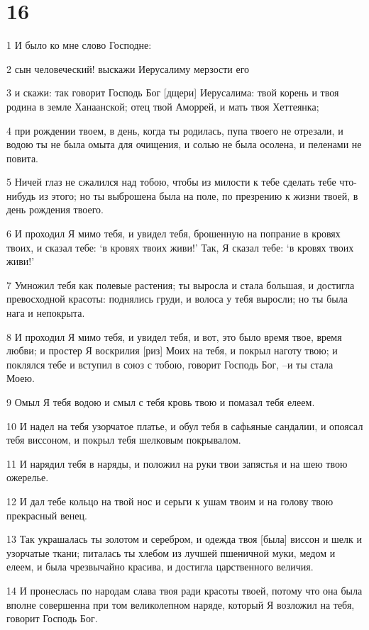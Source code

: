 \chapter{16}

\par 1 И было ко мне слово Господне:
\par 2 сын человеческий! выскажи Иерусалиму мерзости его
\par 3 и скажи: так говорит Господь Бог [дщери] Иерусалима: твой корень и твоя родина в земле Ханаанской; отец твой Аморрей, и мать твоя Хеттеянка;
\par 4 при рождении твоем, в день, когда ты родилась, пупа твоего не отрезали, и водою ты не была омыта для очищения, и солью не была осолена, и пеленами не повита.
\par 5 Ничей глаз не сжалился над тобою, чтобы из милости к тебе сделать тебе что-нибудь из этого; но ты выброшена была на поле, по презрению к жизни твоей, в день рождения твоего.
\par 6 И проходил Я мимо тебя, и увидел тебя, брошенную на попрание в кровях твоих, и сказал тебе: `в кровях твоих живи!' Так, Я сказал тебе: `в кровях твоих живи!'
\par 7 Умножил тебя как полевые растения; ты выросла и стала большая, и достигла превосходной красоты: поднялись груди, и волоса у тебя выросли; но ты была нага и непокрыта.
\par 8 И проходил Я мимо тебя, и увидел тебя, и вот, это было время твое, время любви; и простер Я воскрилия [риз] Моих на тебя, и покрыл наготу твою; и поклялся тебе и вступил в союз с тобою, говорит Господь Бог, --и ты стала Моею.
\par 9 Омыл Я тебя водою и смыл с тебя кровь твою и помазал тебя елеем.
\par 10 И надел на тебя узорчатое платье, и обул тебя в сафьяные сандалии, и опоясал тебя виссоном, и покрыл тебя шелковым покрывалом.
\par 11 И нарядил тебя в наряды, и положил на руки твои запястья и на шею твою ожерелье.
\par 12 И дал тебе кольцо на твой нос и серьги к ушам твоим и на голову твою прекрасный венец.
\par 13 Так украшалась ты золотом и серебром, и одежда твоя [была] виссон и шелк и узорчатые ткани; питалась ты хлебом из лучшей пшеничной муки, медом и елеем, и была чрезвычайно красива, и достигла царственного величия.
\par 14 И пронеслась по народам слава твоя ради красоты твоей, потому что она была вполне совершенна при том великолепном наряде, который Я возложил на тебя, говорит Господь Бог.
